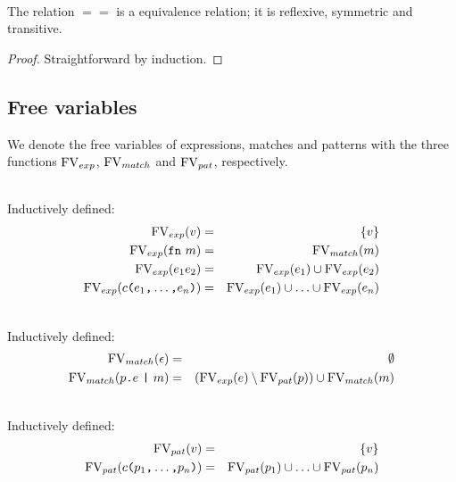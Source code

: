 \begin{lemma}\ \\
  The relation $==$ is a equivalence relation; it is reflexive, symmetric and
  transitive.

  \begin{proof}
    Straightforward by induction.
  \end{proof}
\end{lemma}

\subsection{Free variables}\label{sec:free-variables}

We denote the free variables of expressions, matches and patterns with the three
functions $\mathrm{FV}_{exp}$, $\mathrm{FV}_{match}$ and $\mathrm{FV}_{pat}$, respectively.

\begin{definition}\ \\
  Inductively defined:
  \begin{eqnarray}
    \mathrm{FV}_{exp} (v) &=& \{v\} \\
    \mathrm{FV}_{exp} (\texttt{fn}\  m) &=& \mathrm{FV}_{match} (m) \\
    \mathrm{FV}_{exp} (e_1e_2) &=& \mathrm{FV}_{exp} (e_1) \cup \mathrm{FV}_{exp} (e_2) \\
    \mathrm{FV}_{exp} (c\texttt{(}e_1\texttt{,} \ldots \texttt{,} e_n \texttt{)}) &=& \mathrm{FV}_{exp}
    (e_1) \cup \ldots \cup \mathrm{FV}_{exp} (e_n)
  \end{eqnarray}
\end{definition}

\begin{definition}\ \\
  Inductively defined:
  \begin{eqnarray}
    \mathrm{FV}_{match} (\epsilon) &=& \emptyset \\
    \mathrm{FV}_{match} (p\texttt{.}e\ \texttt{|}\ m) &=& \left( \mathrm{FV}_{exp}(e) \setminus
      \mathrm{FV}_{pat}(p) \right) \cup \mathrm{FV}_{match} (m)
  \end{eqnarray}
\end{definition}

\begin{definition} \ \\
  Inductively defined:
  \begin{eqnarray}
    \mathrm{FV}_{pat} (v) &=& \{v\} \\
    \mathrm{FV}_{pat} (c\texttt{(}p_1\texttt{,} \ldots \texttt{,} p_n\texttt{)}) &=& \mathrm{FV}_{pat} (p_1)
    \cup \ldots \cup \mathrm{FV}_{pat} (p_n)
  \end{eqnarray}
\end{definition}

